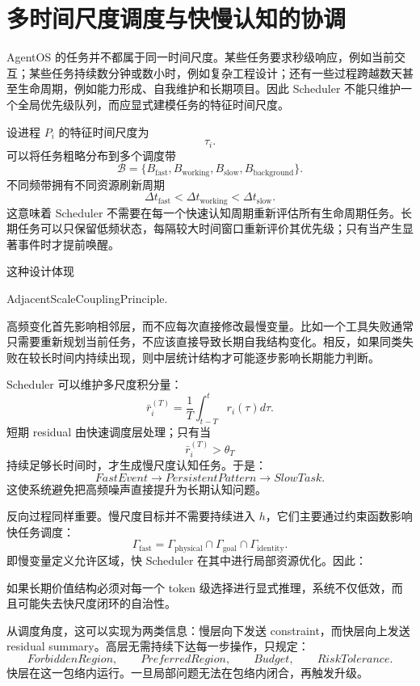 \section{多时间尺度调度与快慢认知的协调}

AgentOS 的任务并不都属于同一时间尺度。某些任务要求秒级响应，例如当前交互；某些任务持续数分钟或数小时，例如复杂工程设计；还有一些过程跨越数天甚至生命周期，例如能力形成、自我维护和长期项目。因此 Scheduler 不能只维护一个全局优先级队列，而应显式建模任务的特征时间尺度。

设进程 $P_i$ 的特征时间尺度为
\[
\tau_i.
\]
可以将任务粗略分布到多个调度带
\[
\mathcal B=
\{
B_{\mathrm{fast}},
B_{\mathrm{working}},
B_{\mathrm{slow}},
B_{\mathrm{background}}
\}.
\]
不同频带拥有不同资源刷新周期
\[
\Delta t_{\mathrm{fast}}
<
\Delta t_{\mathrm{working}}
<
\Delta t_{\mathrm{slow}}.
\]
这意味着 Scheduler 不需要在每一个快速认知周期重新评估所有生命周期任务。长期任务可以只保留低频状态，每隔较大时间窗口重新评价其优先级；只有当产生显著事件时才提前唤醒。

这种设计体现
\begin{statementbox}
AdjacentScaleCouplingPrinciple.
\end{statementbox}
高频变化首先影响相邻层，而不应每次直接修改最慢变量。比如一个工具失败通常只需要重新规划当前任务，不应该直接导致长期自我结构变化。相反，如果同类失败在较长时间内持续出现，则中层统计结构才可能逐步影响长期能力判断。

Scheduler 可以维护多尺度积分量：
\[
\bar r_i^{(T)}
=
\frac{1}{T}
\int_{t-T}^t
r_i(\tau)d\tau.
\]
短期 residual 由快速调度层处理；只有当
\[
\bar r_i^{(T)}
>
\theta_T
\]
持续足够长时间时，才生成慢尺度认知任务。于是：
\[
FastEvent
\rightarrow
PersistentPattern
\rightarrow
SlowTask.
\]
这使系统避免把高频噪声直接提升为长期认知问题。

反向过程同样重要。慢尺度目标并不需要持续进入 $h$，它们主要通过约束函数影响快任务调度：
\[
\Gamma_{\mathrm{fast}}
=
\Gamma_{\mathrm{physical}}
\cap
\Gamma_{\mathrm{goal}}
\cap
\Gamma_{\mathrm{identity}}.
\]
即慢变量定义允许区域，快 Scheduler 在其中进行局部资源优化。因此：
\begin{statementbox}
\centering
{}
\end{statementbox}
如果长期价值结构必须对每一个 token 级选择进行显式推理，系统不仅低效，而且可能失去快尺度闭环的自治性。

从调度角度，这可以实现为两类信息：慢层向下发送 constraint，而快层向上发送 residual summary。高层无需持续下达每一步操作，只规定：
\[
ForbiddenRegion,\qquad
PreferredRegion,\qquad
Budget,\qquad
RiskTolerance.
\]
快层在这一包络内运行。一旦局部问题无法在包络内闭合，再触发升级。

